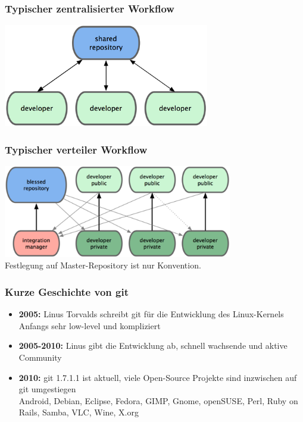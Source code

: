 \begin{frame}
  \frametitle{Typischer zentralisierter Workflow}
  \begin{center}
    \includegraphics[width=9cm]{img/centralized_workflow.png}
  \end{center}
\end{frame}

\begin{frame}
  \frametitle{Typischer verteiler Workflow}
  \begin{center}
    \includegraphics[width=10cm]{img/distributed_workflow.png} \\
    \vspace{0.5cm}
    Festlegung auf Master-Repository ist nur Konvention.
  \end{center}
\end{frame}

\begin{frame}
  \frametitle{Kurze Geschichte von git}
  \begin{itemize}
    \item {\bf 2005:} Linus Torvalds schreibt git für die Entwicklung des Linux-Kernels \\ Anfangs sehr low-level und kompliziert
    \item {\bf 2005-2010:} Linus gibt die Entwicklung ab, schnell wachsende und aktive Community
    \item {\bf 2010:} git 1.7.1.1 ist aktuell, viele Open-Source Projekte sind inzwischen auf git umgestiegen \\ Android, Debian, Eclipse, Fedora, GIMP, Gnome, openSUSE, Perl, Ruby on Rails, Samba, VLC, Wine, X.org
    \end{itemize}
\end{frame}


